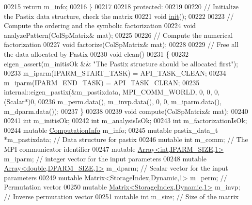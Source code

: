 \begin{DoxyCode}
00215       \textcolor{keywordflow}{return} m\_info;
00216     \}
00217     
00218   \textcolor{keyword}{protected}:
00219 
00220     \textcolor{comment}{// Initialize the Pastix data structure, check the matrix}
00221     \textcolor{keywordtype}{void} \hyperlink{structinit}{init}(); 
00222     
00223     \textcolor{comment}{// Compute the ordering and the symbolic factorization}
00224     \textcolor{keywordtype}{void} analyzePattern(ColSpMatrix& mat);
00225     
00226     \textcolor{comment}{// Compute the numerical factorization}
00227     \textcolor{keywordtype}{void} factorize(ColSpMatrix& mat);
00228     
00229     \textcolor{comment}{// Free all the data allocated by Pastix}
00230     \textcolor{keywordtype}{void} clean()
00231     \{
00232       eigen\_assert(m\_initisOk && \textcolor{stringliteral}{"The Pastix structure should be allocated first"}); 
00233       m\_iparm(IPARM\_START\_TASK) = API\_TASK\_CLEAN;
00234       m\_iparm(IPARM\_END\_TASK) = API\_TASK\_CLEAN;
00235       internal::eigen\_pastix(&m\_pastixdata, MPI\_COMM\_WORLD, 0, 0, 0, (Scalar*)0,
00236                              m\_perm.data(), m\_invp.data(), 0, 0, m\_iparm.data(), m\_dparm.data());
00237     \}
00238     
00239     \textcolor{keywordtype}{void} compute(ColSpMatrix& mat);
00240     
00241     \textcolor{keywordtype}{int} m\_initisOk; 
00242     \textcolor{keywordtype}{int} m\_analysisIsOk;
00243     \textcolor{keywordtype}{int} m\_factorizationIsOk;
00244     \textcolor{keyword}{mutable} \hyperlink{group__enums_ga85fad7b87587764e5cf6b513a9e0ee5e}{ComputationInfo} m\_info; 
00245     \textcolor{keyword}{mutable} pastix\_data\_t *m\_pastixdata; \textcolor{comment}{// Data structure for pastix}
00246     \textcolor{keyword}{mutable} \textcolor{keywordtype}{int} m\_comm; \textcolor{comment}{// The MPI communicator identifier}
00247     \textcolor{keyword}{mutable} \hyperlink{group___core___module}{Array<int,IPARM\_SIZE,1>} m\_iparm; \textcolor{comment}{// integer vector for the input
       parameters}
00248     \textcolor{keyword}{mutable} \hyperlink{group___core___module}{Array<double,DPARM\_SIZE,1>} m\_dparm; \textcolor{comment}{// Scalar vector for the input
       parameters}
00249     \textcolor{keyword}{mutable} \hyperlink{group___core___module}{Matrix<StorageIndex,Dynamic,1>} m\_perm;  \textcolor{comment}{// Permutation vector}
00250     \textcolor{keyword}{mutable} \hyperlink{group___core___module}{Matrix<StorageIndex,Dynamic,1>} m\_invp;  \textcolor{comment}{// Inverse permutation
       vector}
00251     \textcolor{keyword}{mutable} \textcolor{keywordtype}{int} m\_size; \textcolor{comment}{// Size of the matrix }

\end{DoxyCode}
